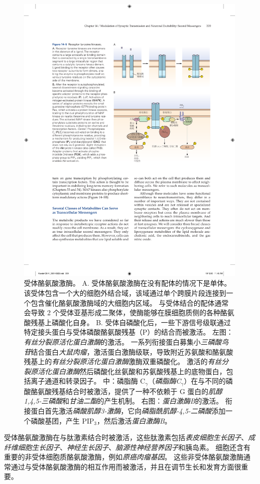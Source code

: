 \begin{figure}[htbp]
	\centering
	\includegraphics[width=0.8\linewidth]{chap14/fig_14_5}
	\caption{受体酪氨酸激酶。 
		A. 受体酪氨酸激酶在没有配体的情况下是单体。
		该受体包含一个大的细胞外结合域，该域通过单个跨膜片段连接到一个包含催化酪氨酸激酶域的大细胞内区域。
		与受体结合的配体通常会导致 2 个受体亚基形成二聚体，使酶能够在膜细胞质侧的各种酪氨酸残基上磷酸化自身。
		B. 受体自磷酸化后，一些下游信号级联通过特定接头蛋白与受体磷酸酪氨酸残基（P）的结合而被激活。
		左图：\textit{有丝分裂原活化蛋白激酶}的激活。
		一系列衔接蛋白募集小\textit{三磷酸鸟苷}结合蛋白\textit{大鼠肉瘤}，激活蛋白激酶级联，导致附近苏氨酸和酪氨酸残基上的\textit{有丝分裂原活化蛋白激酶}激酶双重磷酸化。
		激活的\textit{有丝分裂原活化蛋白激酶}然后磷酸化丝氨酸和苏氨酸残基上的底物蛋白，包括离子通道和转录因子。
		中：磷脂酶 C$_{\gamma}$（\textit{磷脂酶C}$_{\gamma}$）在与不同的磷酸酪氨酸残基结合时被激活，提供了一种不依赖于 G 蛋白的\textit{肌醇1,4,5-三磷酸}和\textit{甘油二酯}的产生机制。
		右图：\textit{蛋白激酶B}的激活。
		衔接蛋白首先激活\textit{磷酸肌醇3-激酶}，它向\textit{磷脂酰肌醇-4,5-二磷酸}添加一个磷酸基团，产生 PIP$_3$，然后激活\textit{蛋白激酶B}。}
	\label{fig:14_5}
\end{figure}


受体酪氨酸激酶在与肽激素结合时被激活，这些肽激素包括\textit{表皮细胞生长因子}、\textit{成纤维细胞生长因子}、\textit{神经生长因子}、\textit{脑源性神经营养因子}和胰岛素。
细胞还含有重要的非受体细胞质酪氨酸激酶，例如\textit{原癌肉瘤基因}。
这些非受体酪氨酸激酶通常通过与受体酪氨酸激酶的相互作用而被激活，并且在调节生长和发育方面很重要。


